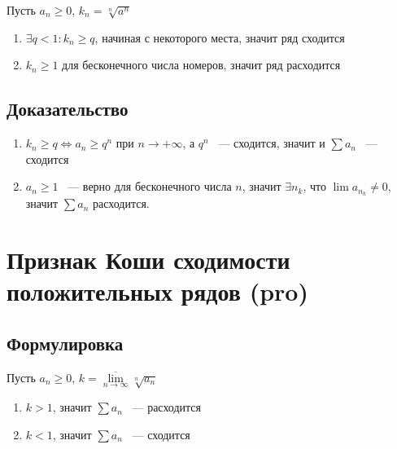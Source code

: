 \documentclass{article}
\begin{document}
            Пусть $a_n \geq 0$, $k_n = \sqrt[n]{a^n}$
            
            \begin{enumerate}
            
                \item $\exists q < 1 : k_n \geq q$, начиная с некоторого места, значит ряд сходится 
                
                \item $k_n \geq 1$ для бесконечного числа номеров, значит ряд расходится
                
            \end{enumerate}
            
        \subsection{Доказательство}
        
            \begin{enumerate}
            
                \item $k_n \geq q \Leftrightarrow a_n \geq q^n$ при $n \rightarrow +\infty$, а $q^n$ ~--- сходится, значит и $\sum a_n$ ~--- сходится
                
                \item $a_n \geq 1$ ~--- верно для бесконечного числа $n$, значит $\exists n_k$, что $\lim a_{n_k} \neq 0$, значит $\sum a_n$ расходится.
                
            \end{enumerate}
            
    \newpage
    
    \section{Признак Коши сходимости положительных рядов (pro)}
    
        \subsection{Формулировка}
        
            Пусть $a_n \geq 0$, $k = \overline{\lim\limits_{n \rightarrow \infty}} \sqrt[n]{a_n}$
            
            \begin{enumerate}
            
                \item $k > 1$, значит $\sum a_n$ ~--- расходится
                
                \item $k < 1$, значит $\sum a_n$ ~--- сходится
                
            \end{enumerate}
            
\end{document}
